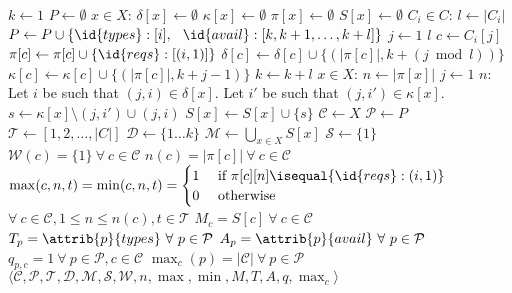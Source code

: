 \begin{codebox}
\li $k \gets 1$
\li $P \gets \emptyset$
\li \For $x \in X$:
\li \Do $\delta[x] \gets \emptyset$
\li     $\kappa[x] \gets \emptyset$
\li     $\pi[x] \gets \emptyset$
\li     $S[x] \gets \emptyset$
\End
\li \For $C_i \in C$:
\li \Do $l \gets |C_i|$
\li     $P \gets P \cup \{\id{types}: [i],$
\li\>\>          $\ \id{avail}: [k, k + 1, \dots, k + l]\}$
\li     \For $j \gets 1$ \To $l$
\li     \Do $c \gets C_i[j]$
\li         $\pi[c] \gets \pi[c] \cup \{\id{reqs} : [(i, 1)]\}$
\li         $\delta[c] \gets \delta[c] \cup \{(|\pi[c]|, k + (j \bmod{l}))\}$
\li         $\kappa[c] \gets \kappa[c] \cup \{(|\pi[c]|, k + j - 1)\}$
\End
\li     $k \gets k + l$
\End
\li \For $x \in X$:
\li \Do $n \gets |\pi[x]|$
\li     \For $j \gets 1$ \To $n$:
\li     \Do Let $i$ be such that $(j, i) \in \delta[x]$.
\li         Let $i'$ be such that $(j, i') \in \kappa[x]$.
\li         $s \gets \kappa[x] \setminus (j, i') \cup (j, i)$
\li         $S[x] \gets S[x] \cup \{s\}$
        \End
\End
\li $\mathcal{C} \gets X$
\li $\mathcal{P} \gets P$
\li $\mathcal{T} \gets [1, 2, \dots, |C|]$
\li $\mathcal{D} \gets \{1 \dots k\}$
\li $\mathcal{M} \gets \bigcup_{x \in X} S[x]$
\li $\mathcal{S} \gets \{1\}$
\li $\mathcal{W}(c) = \{1\}\ \forall\ c \in \mathcal{C}$
\li $n(c) = |\pi[c]|\ \forall\ c \in \mathcal{C}$
\li $\max(c, n, t) = \min(c, n, t) = \begin{cases}
1 & \text{ if } \pi[c][n] \isequal \{\id{reqs} : (i, 1)\}\\
0 & \text{ otherwise}
\end{cases}$
\li \>\>$\forall\ c \in \mathcal{C}, 1 \le n \le n(c), t \in \mathcal{T}$
\li $M_c = S[c]\ \forall\ c \in \mathcal{C}$
\li $T_p = \attrib{p}{types}\ \forall\ p \in \mathcal{P}$
\li $A_p = \attrib{p}{avail}\ \forall\ p \in \mathcal{P}$
\li $q_{p, c} = 1\ \forall\ p \in \mathcal{P}, c \in \mathcal{C}$
\li $\max_c(p) = |\mathcal{C}|\ \forall\ p \in \mathcal{P}$
\li \Return $\langle \mathcal{C}, \mathcal{P}, \mathcal{T}, \mathcal{D}, \mathcal{M}, \mathcal{S}, \mathcal{W}, n, \max, \min, M, T, A, q, \max_c \rangle$
\end{codebox}





